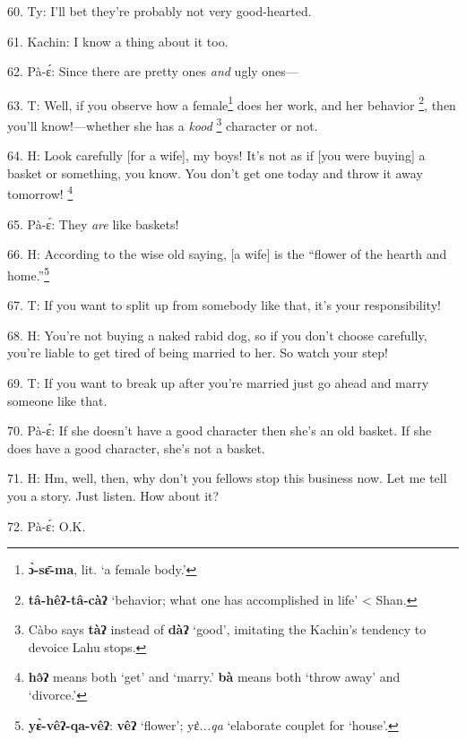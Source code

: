 60. Ty: I'll bet they're probably not very good-hearted.

61. Kachin: I know a thing about it too.

62. Pà-ɛ́: Since there are pretty ones \textit{and} ugly ones---

63. T: Well, if you observe how a female\footnote{\textbf{ɔ̀-sɛ̄-ma}, lit. `a female body.'} does her work, and her behavior
\footnote{\textbf{tâ-hêʔ-tâ-càʔ} `behavior; what one has accomplished in life' < Shan.}, then you'll know!---whether she has a \textit{kood} \footnote{Càbo says \textbf{tàʔ} instead of \textbf{dàʔ} `good', imitating the Kachin's tendency to devoice Lahu stops.} character or not.

64. H: Look carefully [for a wife], my boys! It's not as if [you were buying] a
basket or something, you know. You don't get one today and throw it away tomorrow!
\footnote{\textbf{hə̂ʔ} means both `get' and `marry.' \textbf{bà} means both `throw away' and `divorce.'}

65. Pà-ɛ́: They \textit{are} like baskets!

66. H: According to the wise old saying, [a wife] is the ``flower of the hearth
and home.''\footnote{\textbf{yɛ̀-vêʔ-qa-vêʔ}: \textbf{vêʔ} `flower'; yɛ\textit{̀...qa} `elaborate couplet for `house'.}

67. T: If you want to split up from somebody like that, it's your responsibility!

68. H: You're not buying a naked rabid dog, so if you don't choose carefully, you're
liable to get tired of being married to her. So watch your step!

69. T: If you want to break up after you're married just go ahead and marry
someone like that.

70. Pà-ɛ́: If she doesn't have a good character then she's an old basket. If
she does have a good character, she's not a basket.

71. H: Hm, well, then, why don't you fellows stop this business now. Let me tell
you a story. Just listen. How about it?

72. Pà-ɛ́: O.K.

